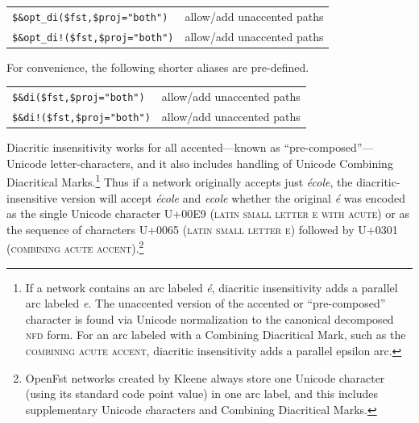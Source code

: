 \documentclass[letterpaper,12pt]{article}
\newcommand{\acro}{\textsc}
\begin{document}
\vspace{0.5cm}

\noindent
\begin{tabular}{|l|l|}
\hline
\verb/$&opt_di($fst,/\verb!$proj="both"!\verb!)! & allow/add unaccented paths\\
\verb/$&opt_di!($fst,/\verb!$proj="both"!\verb!)! & allow/add unaccented paths\\
\hline
\end{tabular}

\vspace{0.5cm}

\noindent
For convenience, the following shorter aliases are pre-defined.

\vspace{0.5cm}

\noindent
\begin{tabular}{|l|l|}
\hline
\verb/$&di($fst,/\verb!$proj="both"!\verb!)! & allow/add unaccented paths\\
\verb/$&di!($fst,/\verb!$proj="both"!\verb!)! & allow/add unaccented paths\\
\hline
\end{tabular}

\vspace{0.5cm}

Diacritic insensitivity works for all accented---known as
``pre-composed''---Unicode letter-characters, and it also includes
handling of Unicode Combining Diacritical Marks.\footnote{If a network
contains an arc labeled \emph{\'e}, diacritic insensitivity adds a
parallel arc labeled \emph{e}.  The unaccented version of the accented or
``pre-composed'' character is found via Unicode normalization to the
canonical decomposed \acro{nfd} form.  For an arc labeled with a
Combining Diacritical Mark, such as the \acro{combining acute accent},
diacritic insensitivity adds a parallel epsilon arc.}  Thus if a network
originally accepts just \emph{\'ecole}, the diacritic-insensitive version
will accept \emph{\'ecole} and \emph{ecole} whether the original
\emph{\'e} was encoded as the single Unicode character U+00E9
(\acro{latin small letter e with acute}) or as the sequence of characters
U+0065 (\acro{latin small letter e}) followed by U+0301 (\acro{combining
acute accent}).\footnote{OpenFst networks created by Kleene always store
one Unicode character (using its standard code point value) in one arc
label, and this includes supplementary Unicode characters and Combining
Diacritical Marks.}

\newpage
\end{document}

